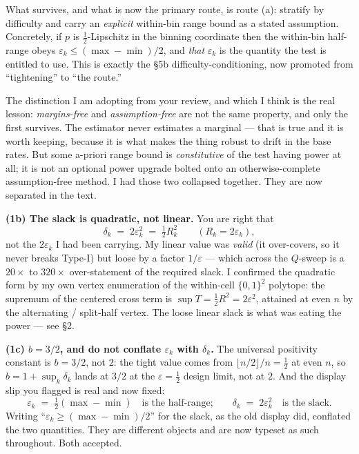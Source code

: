 \documentclass[11pt,a4paper]{article}
\begin{document}
What survives, and what is now the primary route, is route (a): stratify by
difficulty and carry an \emph{explicit} within-bin range bound as a stated
assumption. Concretely, if $p$ is $\tfrac12$-Lipschitz in the binning coordinate
then the within-bin half-range obeys $\varepsilon_k \le (\max - \min)/2$, and
\emph{that} $\varepsilon_k$ is the quantity the test is entitled to use. This is
exactly the \S5b difficulty-conditioning, now promoted from ``tightening'' to
``the route.''

The distinction I am adopting from your review, and which I think is the real
lesson: \emph{margins-free} and \emph{assumption-free} are not the same property,
and only the first survives. The estimator never estimates a marginal --- that
is true and it is worth keeping, because it is what makes the thing robust to
drift in the base rates. But some a-priori range bound is \emph{constitutive} of
the test having power at all; it is not an optional power upgrade bolted onto an
otherwise-complete assumption-free method. I had those two collapsed together.
They are now separated in the text.

\medskip
\noindent\textbf{(1b) The slack is quadratic, not linear.} You are right that
\[
  \delta_k \;=\; 2\varepsilon_k^2 \;=\; \tfrac12 R_k^2
  \qquad (R_k = 2\varepsilon_k),
\]
not the $2\varepsilon_k$ I had been carrying. My linear value was \emph{valid}
(it over-covers, so it never breaks Type-I) but loose by a factor $1/\varepsilon$
--- which across the $Q$-sweep is a $20\times$ to $320\times$ over-statement of
the required slack. I confirmed the quadratic form by my own vertex enumeration
of the within-cell $\{0,1\}^2$ polytope: the supremum of the centered cross term
is $\sup T = \tfrac12 R^2 = 2\varepsilon^2$, attained at even $n$ by the
alternating / split-half vertex. The loose linear slack is what was eating the
power --- see \S2.

\medskip
\noindent\textbf{(1c) $b = 3/2$, and do not conflate $\varepsilon_k$ with
$\delta_k$.} The universal positivity constant is $b = 3/2$, not $2$: the tight
value comes from $\lfloor n/2\rfloor / n = \tfrac12$ at even $n$, so
$b = 1 + \sup_k \delta_k$ lands at $3/2$ at the $\varepsilon = \tfrac12$ design
limit, not at $2$. And the display slip you flagged is real and now fixed:
\[
  \varepsilon_k \;=\; \tfrac12(\max - \min)
  \quad\text{is the half-range;}\qquad
  \delta_k \;=\; 2\varepsilon_k^2
  \quad\text{is the slack.}
\]
Writing ``$\varepsilon_k \ge (\max-\min)/2$'' for the slack, as the old display
did, conflated the two quantities. They are different objects and are now typeset
as such throughout. Both accepted.
\end{document}
